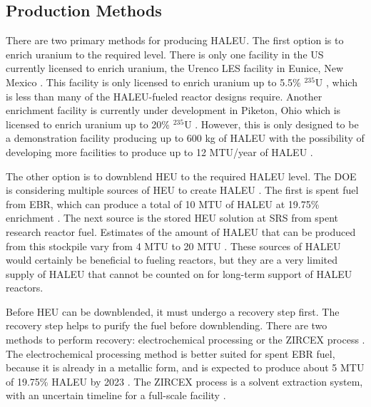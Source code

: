 \subsection{Production Methods}
There are two primary methods for producing \gls{HALEU}. The first 
option is to enrich uranium to the required level. There is only one 
facility in the US currently 
licensed to enrich uranium, the Urenco LES facility in Eunice, 
New Mexico \cite{nuclear_energy_institute_establishing_2022}. This facility is only 
licensed to enrich uranium up to 5.5\% $^{235}$U 
\cite{nuclear_energy_institute_establishing_2022},
which is less than many of the \gls{HALEU}-fueled reactor designs 
require. Another enrichment facility is currently under development in 
Piketon, Ohio which is licensed to enrich uranium up to 20\% 
$^{235}$U \cite{nuclear_energy_institute_establishing_2022}. However, this is only 
designed to be a demonstration facility producing up to 600 kg of 
\gls{HALEU} \cite{us_nrc_centrus_2021} with the possibility of 
developing more facilities to produce up to 12 MTU/year of \gls{HALEU}
\cite{nuclear_energy_institute_establishing_2022}.

The other option is to downblend \gls{HEU} to the required \gls{HALEU}
level. The \gls{DOE} is considering multiple sources of \gls{HEU} 
to create \gls{HALEU} \cite{nuclear_energy_institute_establishing_2022}. The 
first is spent fuel from \gls{EBR}, which can produce a total of 10 MTU 
of \gls{HALEU} at 19.75\% enrichment \cite{nuclear_energy_institute_establishing_2022}. 
The next source is the stored \gls{HEU} solution at \gls{SRS} from 
spent research reactor fuel. Estimates of the amount of \gls{HALEU}
that can be produced from this stockpile vary from 4 MTU 
\cite{nuclear_energy_institute_establishing_2022} to 20 MTU \cite{regalbuto_addressing_2020}.
These sources of 
\gls{HALEU} would certainly be beneficial to fueling reactors, but they 
are a very limited supply of \gls{HALEU} that cannot be counted on 
for long-term support of \gls{HALEU} reactors.

Before \gls{HEU} can be downblended, it must undergo a recovery step first. 
The recovery step helps to purify the fuel before downblending. There 
are two methods to perform recovery: electrochemical processing or 
the ZIRCEX process \cite{herczeg_high-assay_2019}. The electrochemical 
processing method is better suited for spent \gls{EBR} fuel, because it is 
already in a metallic form, and is expected to produce about 5 MTU of 
19.75\% \gls{HALEU} by 2023 \cite{herczeg_high-assay_2019}. The ZIRCEX 
process is a solvent extraction system, with an uncertain timeline 
for a full-scale facility \cite{herczeg_high-assay_2019}. 

